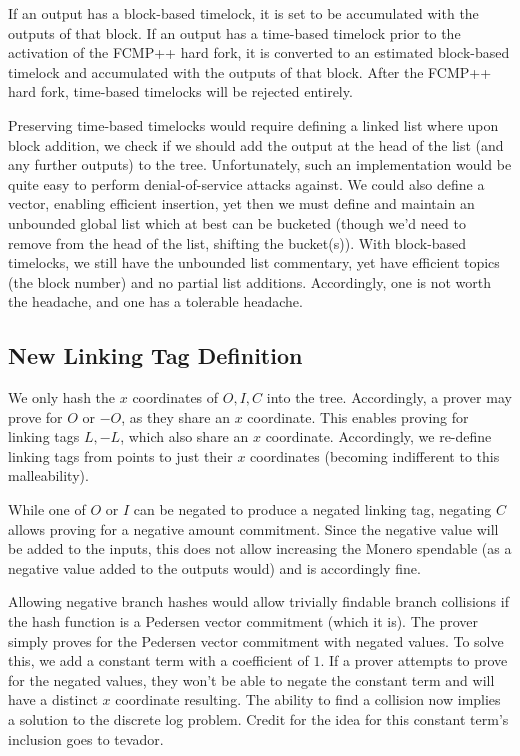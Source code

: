 \documentclass[]{article}
\begin{document}
If an output has a block-based timelock, it is set to be accumulated with the outputs of that block. If an output has a time-based timelock prior to the activation of the FCMP++ hard fork, it is converted to an estimated block-based timelock and accumulated with the outputs of that block. After the FCMP++ hard fork, time-based timelocks will be rejected entirely.

Preserving time-based timelocks would require defining a linked list where upon block addition, we check if we should add the output at the head of the list (and any further outputs) to the tree. Unfortunately, such an implementation would be quite easy to perform denial-of-service attacks against. We could also define a vector, enabling efficient insertion, yet then we must define and maintain an unbounded global list which at best can be bucketed (though we'd need to remove from the head of the list, shifting the bucket(s)). With block-based timelocks, we still have the unbounded list commentary, yet have efficient topics (the block number) and no partial list additions. Accordingly, one is not worth the headache, and one has a tolerable headache.

\subsection{New Linking Tag Definition}

We only hash the $x$ coordinates of $O, I, C$ into the tree. Accordingly, a prover may prove for $O$ or $-O$, as they share an $x$ coordinate. This enables proving for linking tags $L, -L$, which also share an $x$ coordinate. Accordingly, we re-define linking tags from points to just their $x$ coordinates (becoming indifferent to this malleability).

While one of $O$ or $I$ can be negated to produce a negated linking tag, negating $C$ allows proving for a negative amount commitment. Since the negative value will be added to the inputs, this does not allow increasing the Monero spendable (as a negative value added to the outputs would) and is accordingly fine.

Allowing negative branch hashes would allow trivially findable branch collisions if the hash function is a Pedersen vector commitment (which it is). The prover simply proves for the Pedersen vector commitment with negated values. To solve this, we add a constant term with a coefficient of $1$. If a prover attempts to prove for the negated values, they won't be able to negate the constant term and will have a distinct $x$ coordinate resulting. The ability to find a collision now implies a solution to the discrete log problem. Credit for the idea for this constant term's inclusion goes to tevador.
\end{document}
